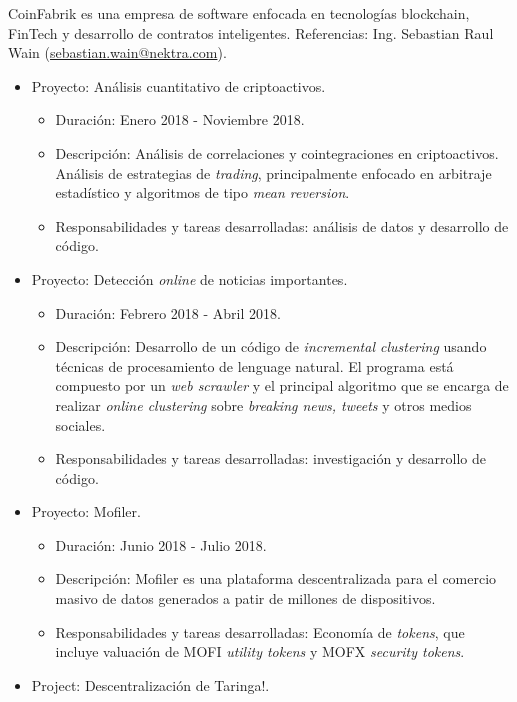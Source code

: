 \documentclass[11pt,a4paper,sans]{moderncv}        %
\begin{document}
{CoinFabrik es una empresa de software enfocada en tecnologías blockchain, FinTech y desarrollo de contratos inteligentes.
Referencias: Ing. Sebastian Raul Wain (\href{mailto:sebastian.wain@nektra.com}{sebastian.wain@nektra.com}).
\begin{itemize}%
\item Proyecto: Análisis cuantitativo de criptoactivos.
	\begin{itemize}%
	\item Duración: Enero 2018 - Noviembre 2018.
	\item Descripción: Análisis de correlaciones y cointegraciones en criptoactivos. 
	Análisis de estrategias de \textit{trading}, principalmente enfocado en arbitraje estadístico y algoritmos de tipo \textit{mean reversion}.	
	\item Responsabilidades y tareas desarrolladas: análisis de datos y desarrollo de código.
	\end{itemize}
\item Proyecto: Detección \textit{online} de noticias importantes.
	\begin{itemize}%
	\item Duración: Febrero 2018 - Abril 2018.
	\item Descripción: Desarrollo de un código de \textit{incremental clustering} usando técnicas de procesamiento de lenguage natural.
	El programa está compuesto por un \textit{web scrawler} y el principal algoritmo que se encarga de realizar \textit{online clustering} sobre \textit{breaking news,
	tweets} y otros medios sociales.
	\item Responsabilidades y tareas desarrolladas: investigación y desarrollo de código.
	\end{itemize}
\item Proyecto: Mofiler.
	\begin{itemize}%
	\item Duración: Junio 2018 - Julio 2018.
	\item Descripción: Mofiler es una plataforma descentralizada para el comercio masivo de datos generados a patir de millones de dispositivos.	
	\item Responsabilidades y tareas desarrolladas: Economía de \textit{tokens}, que incluye valuación de MOFI \textit{utility tokens} y MOFX \textit{security tokens}.
	\end{itemize}
\item Project: Descentralización de Taringa!.
	\begin{itemize}%

\end{itemize}
\end{itemize}}
\end{document}
